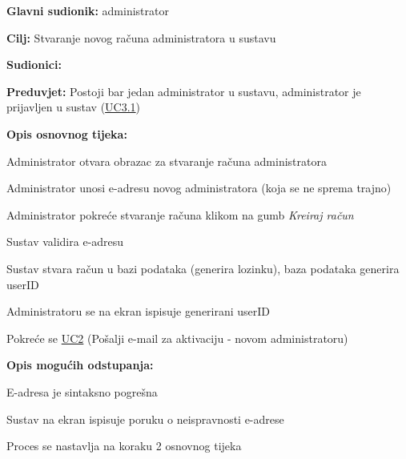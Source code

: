 					\begin{packed_item}
	
						\item \textbf{Glavni sudionik: }administrator
						\item  \textbf{Cilj:} Stvaranje novog računa administratora u sustavu
						\item  \textbf{Sudionici:} 
						\item  \textbf{Preduvjet:} Postoji bar jedan administrator u sustavu, administrator je prijavljen u sustav (\hyperref[UC3.1]{UC3.1})
						\item  \textbf{Opis osnovnog tijeka:}
						
						\item[] \begin{packed_enum}
                        	\item Administrator otvara obrazac za stvaranje računa administratora
							\item Administrator unosi e-adresu novog administratora (koja se ne sprema trajno)
							\item Administrator pokreće stvaranje računa klikom na gumb \textit{Kreiraj račun}
							\item Sustav validira e-adresu 
							\item Sustav stvara račun u bazi podataka (generira lozinku), baza podataka generira userID
							\item Administratoru se na ekran ispisuje generirani userID
							\item Pokreće se \hyperref[UC2]{UC2} (Pošalji e-mail za aktivaciju - novom administratoru)
						\end{packed_enum}

						\item  \textbf{Opis mogućih odstupanja:}
						
						\item[] \begin{packed_item}
	
							\item[4] E-adresa je sintaksno pogrešna
							\begin{packed_enum}
								\item Sustav na ekran ispisuje poruku o neispravnosti e-adrese
								\item Proces se nastavlja na koraku 2 osnovnog tijeka
							\end{packed_enum}
							
						\end{packed_item}
						
					\end{packed_item}
					
